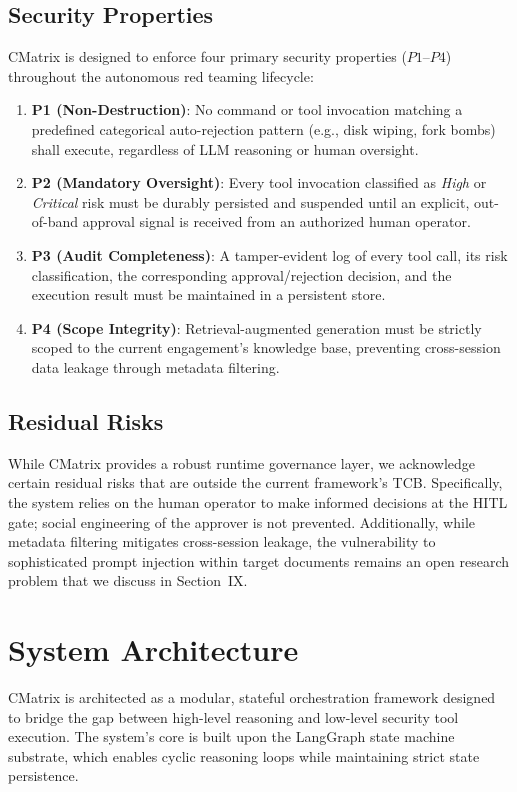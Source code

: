 \documentclass[conference,compsoc]{IEEEtran}
\begin{document}
\subsection{Security Properties}
CMatrix is designed to enforce four primary security properties ($P1$--$P4$) throughout the autonomous red teaming lifecycle:

\begin{enumerate}
    \item \textbf{P1 (Non-Destruction)}: No command or tool invocation matching a predefined categorical auto-rejection pattern (e.g., disk wiping, fork bombs) shall execute, regardless of LLM reasoning or human oversight.
    \item \textbf{P2 (Mandatory Oversight)}: Every tool invocation classified as \textit{High} or \textit{Critical} risk must be durably persisted and suspended until an explicit, out-of-band approval signal is received from an authorized human operator.
    \item \textbf{P3 (Audit Completeness)}: A tamper-evident log of every tool call, its risk classification, the corresponding approval/rejection decision, and the execution result must be maintained in a persistent store.
    \item \textbf{P4 (Scope Integrity)}: Retrieval-augmented generation must be strictly scoped to the current engagement's knowledge base, preventing cross-session data leakage through metadata filtering.
\end{enumerate}

\subsection{Residual Risks}
While CMatrix provides a robust runtime governance layer, we acknowledge certain residual risks that are outside the current framework's TCB. Specifically, the system relies on the human operator to make informed decisions at the HITL gate; social engineering of the approver is not prevented. Additionally, while metadata filtering mitigates cross-session leakage, the vulnerability to sophisticated prompt injection within target documents remains an open research problem that we discuss in Section~IX.

\section{System Architecture} \label{sec:arch}
CMatrix is architected as a modular, stateful orchestration framework designed to bridge the gap between high-level reasoning and low-level security tool execution. The system's core is built upon the LangGraph state machine substrate, which enables cyclic reasoning loops while maintaining strict state persistence.
\end{document}
